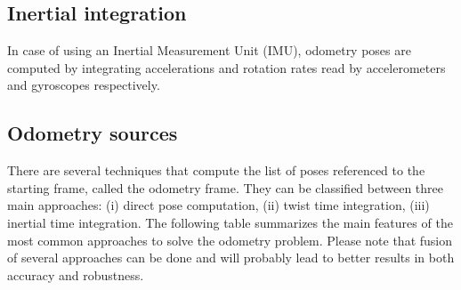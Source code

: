 \subsection{Inertial integration}
In case of using an Inertial Measurement Unit (IMU), odometry poses are computed by integrating accelerations and rotation rates read by accelerometers and gyroscopes respectively.


\subsection{Odometry sources}
There are several techniques that compute the list of poses referenced to the starting frame, called the odometry frame. They can be classified between three main approaches: (i) direct pose computation, (ii) twist time integration, (iii) inertial time integration. The following table summarizes the main features of the most common approaches to solve the odometry problem. Please note that fusion of several approaches can be done and will probably lead to better results in both accuracy and robustness. 


